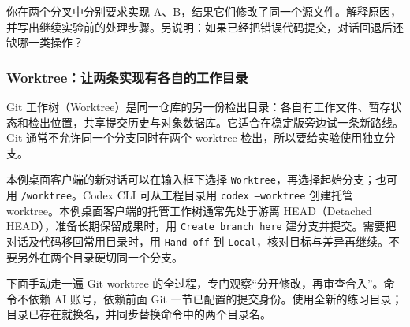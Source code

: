 \begin{exercise}\label{ex:ai-workflow-history}
你在两个分叉中分别要求实现 A、B，结果它们修改了同一个源文件。解释原因，并写出继续实验前的处理步骤。另说明：如果已经把错误代码提交，对话回退后还缺哪一类操作？
\end{exercise}

\subsubsection{Worktree：让两条实现有各自的工作目录}

Git 工作树（Worktree）是同一仓库的另一份检出目录：各自有工作文件、暂存状态和检出位置，共享提交历史与对象数据库。它适合在稳定版旁边试一条新路线。Git 通常不允许同一个分支同时在两个 worktree 检出，所以要给实验使用独立分支。

本例桌面客户端的新对话可以在输入框下选择 \texttt{Worktree}，再选择起始分支；也可用 \texttt{/worktree}。Codex CLI 可从工程目录用 \texttt{codex --worktree} 创建托管 worktree。本例桌面客户端的托管工作树通常先处于游离 HEAD（Detached HEAD），准备长期保留成果时，用 \texttt{Create branch here} 建分支并提交。需要把对话及代码移回常用目录时，用 \texttt{Hand off} 到 \texttt{Local}，核对目标与差异再继续。不要另外在两个目录硬切同一个分支。

下面手动走一遍 Git worktree 的全过程，专门观察“分开修改，再审查合入”。命令不依赖 AI 账号，依赖前面 Git 一节已配置的提交身份。使用全新的练习目录；目录已存在就换名，并同步替换命令中的两个目录名。

